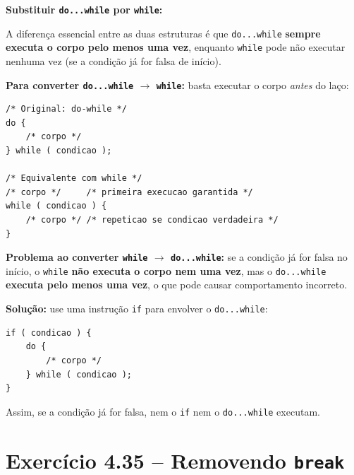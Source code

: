 \documentclass[12pt,a4paper]{article}
\begin{document}
\begin{respostabox}
\textbf{Substituir \texttt{do...while} por \texttt{while}:}

A diferença essencial entre as duas estruturas é que \texttt{do...while} \textbf{sempre
executa o corpo pelo menos uma vez}, enquanto \texttt{while} pode não executar nenhuma
vez (se a condição já for falsa de início).

\textbf{Para converter \texttt{do...while} \(\to\) \texttt{while}:} basta executar o
corpo \textit{antes} do laço:
\begin{lstlisting}
/* Original: do-while */
do {
    /* corpo */
} while ( condicao );

/* Equivalente com while */
/* corpo */     /* primeira execucao garantida */
while ( condicao ) {
    /* corpo */ /* repeticao se condicao verdadeira */
}
\end{lstlisting}

\textbf{Problema ao converter \texttt{while} \(\to\) \texttt{do...while}:} se a
condição já for falsa no início, o \texttt{while} \textbf{não executa o corpo nem uma
vez}, mas o \texttt{do...while} \textbf{executa pelo menos uma vez}, o que pode causar
comportamento incorreto.

\textbf{Solução:} use uma instrução \texttt{if} para envolver o \texttt{do...while}:
\begin{lstlisting}
if ( condicao ) {
    do {
        /* corpo */
    } while ( condicao );
}
\end{lstlisting}

Assim, se a condição já for falsa, nem o \texttt{if} nem o \texttt{do...while} executam.
\end{respostabox}

\section{Exercício 4.35 -- Removendo \texttt{break}}
\end{document}
